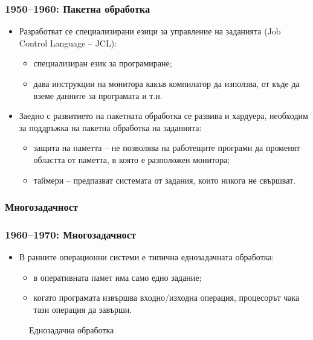 \documentclass[ignorenonframetext, hyperref=unicode]{beamer}
\begin{document}
\begin{frame}
\frametitle{1950--1960: Пакетна обработка}
\begin{itemize}
  \item Разработват се специализирани езици за управление на заданията (Job
  Control Language -- JCL):
  \begin{itemize}
    \item специализиран език за програмиране;
    \item дава инструкции на монитора какъв компилатор да използва, от къде да
    вземе данните за програмата и т.н.
  \end{itemize}
  \item Заедно с развитието на пакетната обработка се развива и хардуера,
  необходим за поддръжка на пакетна обработка на заданията:
  \begin{itemize}
    \item защита на паметта -- не позволява на работещите програми да променят
    областта от паметта, в която е разположен монитора;
    \item таймери -- предпазват системата от задания, които никога не свършват.
  \end{itemize}
\end{itemize}
\end{frame}

\subsubsection{Многозадачност}

\begin{frame}
\frametitle{1960--1970: Многозадачност}
\begin{itemize}
  \item В ранните операционни системи е типична еднозадачната обработка:
  \begin{itemize}
    \item в оперативната памет има само едно задание;
    \item когато програмата извършва входно/изходна операция, процесорът чака
    тази операция да завърши.
  \end{itemize}
\end{itemize}
\begin{figure}
\center
{}
\caption{Еднозадачна обработка}
\end{figure}
\end{frame}
\end{document}
